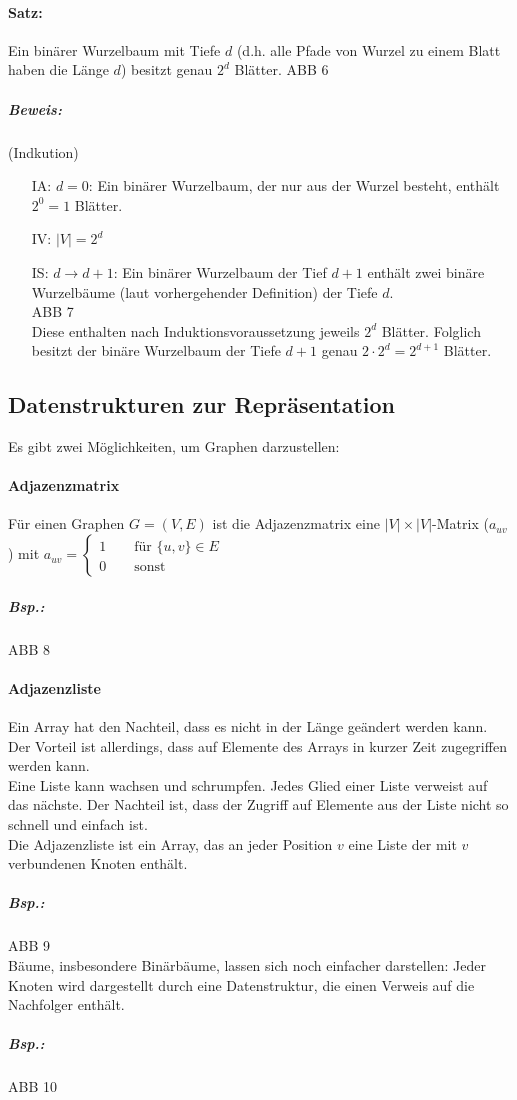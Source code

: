 \paragraph{Satz:} Ein binärer Wurzelbaum mit Tiefe $d$ (d.h. alle Pfade von Wurzel zu einem Blatt haben die Länge $d$) besitzt genau $2^d$ Blätter.
ABB 6
\subparagraph{Beweis:} (Indkution)
\begin{itemize}
\item[IA:] $d=0$: Ein binärer Wurzelbaum, der nur aus der Wurzel besteht, enthält $2^0=1$ Blätter.
\item[IV:] $|V| =2^d$
\item[IS:] $d\rightarrow d+1$: Ein binärer Wurzelbaum der Tief $d+1$ enthält zwei binäre Wurzelbäume (laut vorhergehender Definition) der Tiefe $d$.\\
ABB 7\\
Diese enthalten nach Induktionsvoraussetzung jeweils $2^d$ Blätter. Folglich besitzt der binäre Wurzelbaum der Tiefe $d+1$ genau $2\cdot 2^d=2^{d+1}$ Blätter.
\end{itemize}

\subsection{Datenstrukturen zur Repräsentation}
Es gibt zwei Möglichkeiten, um Graphen darzustellen:
\paragraph{Adjazenzmatrix}
Für einen Graphen $G=(V,E)$ ist die Adjazenzmatrix eine $|V|\times |V|$-Matrix ($a_{uv}$) mit
$a_{uv}=\begin{cases}
1 \qquad \text{für }\{u,v\}\in E\\
0 \qquad \text{sonst}
\end{cases}$
\subparagraph{Bsp.:}
ABB 8
\paragraph{Adjazenzliste} Ein Array hat den Nachteil, dass es nicht in der Länge geändert werden kann. Der Vorteil ist allerdings, dass auf Elemente des Arrays in kurzer Zeit zugegriffen werden kann.\\
Eine  Liste kann wachsen und schrumpfen. Jedes Glied einer Liste verweist auf das nächste. Der 
Nachteil ist, dass der Zugriff auf Elemente aus der Liste nicht so schnell und einfach ist.\smallskip\\
Die Adjazenzliste ist ein Array, das an jeder Position $v$ eine Liste der mit $v$ verbundenen Knoten enthält.
\subparagraph{Bsp.:} \parskp
ABB 9\medskip\\
Bäume, insbesondere Binärbäume, lassen sich noch einfacher darstellen: Jeder Knoten wird dargestellt durch eine Datenstruktur, die einen Verweis auf die Nachfolger enthält.
\subparagraph{Bsp.:}
ABB 10

